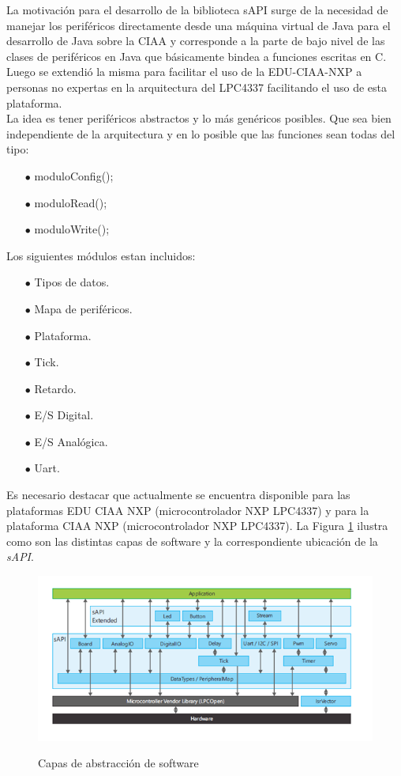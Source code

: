 \documentclass[12pt,letterpaper]{article}
\begin{document}
La motivación para el desarrollo de la biblioteca sAPI surge de la necesidad de manejar los periféricos directamente desde una máquina virtual de Java para el desarrollo de Java sobre la CIAA y corresponde a la parte de bajo nivel de las clases de periféricos en Java que básicamente bindea a funciones escritas en C.
Luego se extendió la misma para facilitar el uso de la EDU-CIAA-NXP a personas no expertas en la arquitectura del LPC4337 facilitando el uso de esta plataforma.
 \\
 
La idea es tener periféricos abstractos y lo más genéricos posibles. Que sea bien independiente de la arquitectura y en lo posible que las funciones sean todas del tipo:
\begin{enumerate}
\item[$\bullet$]	moduloConfig();
\item[$\bullet$]  moduloRead();
\item[$\bullet$]  moduloWrite();
\end{enumerate}
Los siguientes módulos estan incluidos:
\begin{enumerate}
\item[$\bullet$]Tipos de datos.
\item[$\bullet$]Mapa de periféricos.
\item[$\bullet$]Plataforma.
\item[$\bullet$]Tick.
\item[$\bullet$]Retardo.
\item[$\bullet$]E/S Digital.
\item[$\bullet$]E/S Analógica.
\item[$\bullet$]Uart.
\end{enumerate}
 Es necesario destacar que actualmente se encuentra disponible para las plataformas EDU CIAA NXP (microcontrolador NXP LPC4337) y para la plataforma CIAA NXP (microcontrolador NXP LPC4337). La Figura \ref{Fig18} ilustra como son las distintas capas de software y la correspondiente ubicación de la \textit{sAPI}.
 \\

\begin{figure}[!h]
\centering
\includegraphics[width=12 cm]{figuras/primer_proy18.png}\\
\caption{Capas de abstracción de software}
\label{Fig18}
\end{figure}
 
\end{document}
